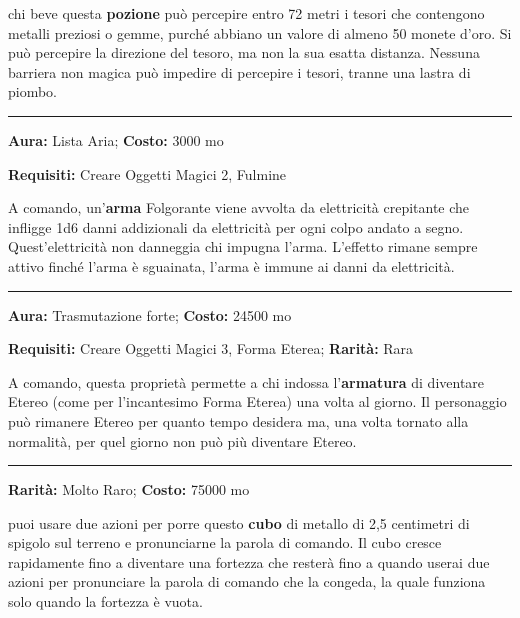 \begin{multicols}{2}
chi beve questa \textbf{pozione} può percepire entro 72 metri i tesori che contengono metalli preziosi o gemme, purché abbiano un valore di almeno 50 monete d'oro. Si può percepire la direzione del tesoro, ma non la sua esatta distanza. Nessuna barriera non magica può impedire di percepire i tesori, tranne una lastra di piombo.

\smallskip\noindent\rule{\linewidth}{2pt}  \hypertarget{Folgorante}{}\smallskip{}\noindent\label{Folgorante}

\textbf{Aura:} Lista Aria; \textbf{Costo:} 3000 mo

\textbf{Requisiti:} Creare Oggetti Magici 2, Fulmine

A comando, un'\textbf{arma} Folgorante viene avvolta da elettricità crepitante che infligge 1d6 danni addizionali da elettricità per ogni colpo andato a segno. Quest'elettricità non danneggia chi impugna l'arma. L'effetto rimane sempre attivo finché l'arma è sguainata, l'arma è immune ai danni da elettricità.

\smallskip\noindent\rule{\linewidth}{2pt}  \hypertarget{FormaEterea}{}\smallskip{}\noindent\label{FormaEterea}

\textbf{Aura:} Trasmutazione forte; \textbf{Costo:} 24500 mo

\textbf{Requisiti:} Creare Oggetti Magici 3, Forma Eterea; \textbf{Rarità:} Rara

A comando, questa proprietà permette a chi indossa l'\textbf{armatura} di diventare Etereo (come per l'incantesimo Forma Eterea) una volta al giorno. Il personaggio può rimanere Etereo per quanto tempo desidera ma, una volta tornato alla normalità, per quel giorno non può più diventare Etereo.

\smallskip\noindent\rule{\linewidth}{2pt}  \hypertarget{FortezzaIstantanea}{}\smallskip{}\noindent\label{FortezzaIstantanea}

\textbf{Rarità:} Molto Raro; \textbf{Costo:} 75000 mo

puoi usare due azioni per porre questo \textbf{cubo} di metallo di 2,5 centimetri di spigolo sul terreno e pronunciarne la parola di comando. Il cubo cresce rapidamente fino a diventare una fortezza che resterà fino a quando userai due azioni per pronunciare la parola di comando che la congeda, la quale funziona solo quando la fortezza è vuota.


\end{multicols}
